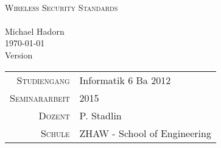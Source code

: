 




\begin{titlepage}
	\mbox{}\vspace{5\baselineskip}\\
	\rmfamily\huge
	\centering
	\textsc{Wireless Security Standards} \\
	\mbox{}\vspace{1\baselineskip}\\
	Michael Hadorn\\
	\vspace{2\baselineskip}
	\rmfamily\Large
	\today\\
	Version \mbox{} \\
	\normalsize
	
	\vfill

	\begin{center}
		\begin{tabular}[h]{ r l }
			\textsc{\small{Studiengang}} & Informatik 6 Ba 2012\\
			\textsc{\small{Seminararbeit}} & 2015\\
			\textsc{\small{Dozent}} & P. Stadlin\\
			\textsc{\small{Schule}} & ZHAW - School of Engineering\\
		\end{tabular}
	\end{center}

\end{titlepage}

 

